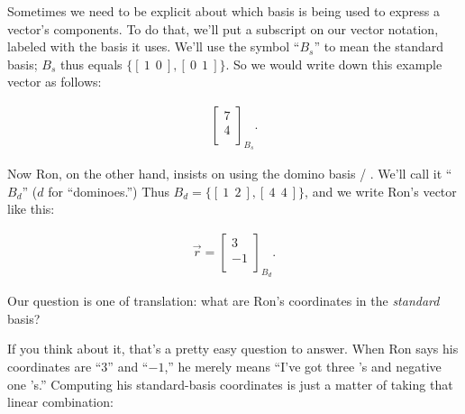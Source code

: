Sometimes we need to be explicit about which basis is being used to express a
vector's components. To do that, we'll put a subscript on our vector notation,
labeled with the basis it uses. We'll use the symbol ``$B_s$'' to mean the
standard basis; $B_s$ thus equals $\{ [\ 1\ \ 0\ ], [\ 0\ \ 1\ ] \}$. So we
would write down this example vector as follows:

\vspace{-.25in}
\begin{align*}
\begin{bmatrix} 7 \\ 4 \\ \end{bmatrix}_{B_s}.
\end{align*}
\vspace{-.15in}

Now Ron, on the other hand, insists on using the domino basis
{\Large /}
.
We'll call it ``$B_d$'' ($d$ for
``dominoes.'') Thus $B_d = \{ [\ 1\ \ 2\ ], [\ 4\ \ 4\ ] \}$, and we write
Ron's vector like this:

\vspace{-.15in}
\begin{align*}
\overrightarrow{r} = \begin{bmatrix} 3 \\ -1 \\ \end{bmatrix}_{B_d}.
\end{align*}
\vspace{-.15in}

Our question is one of translation: what are Ron's coordinates in the
\textit{standard} basis?

If you think about it, that's a pretty easy question to answer. When Ron says
his coordinates are ``3'' and ``$-1$,'' he merely means ``I've got three
's
and negative one
's.''
Computing his standard-basis coordinates is just a matter of taking that linear
combination:


